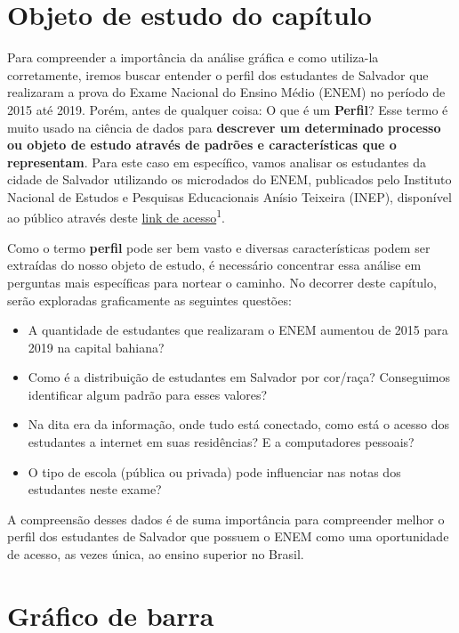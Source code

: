 \documentclass[
  portuguese,
  oneside]{book}
\begin{document}
\hypertarget{objeto-estudo}{%
\section{Objeto de estudo do capítulo}\label{objeto-estudo}}

Para compreender a importância da análise gráfica e como utiliza-la corretamente, iremos buscar entender o perfil dos estudantes de Salvador que realizaram a prova do Exame Nacional do Ensino Médio (ENEM) no período de 2015 até 2019. Porém, antes de qualquer coisa: O que é um \textbf{Perfil}? Esse termo é muito usado na ciência de dados para \textbf{descrever um determinado processo ou objeto de estudo através de padrões e características que o representam}. Para este caso em específico, vamos analisar os estudantes da cidade de Salvador utilizando os microdados do ENEM, publicados pelo Instituto Nacional de Estudos e Pesquisas Educacionais Anísio Teixeira (INEP), disponível ao público através deste \href{http://inep.gov.br/microdados}{link de acesso}\textsuperscript{1}.

Como o termo \textbf{perfil} pode ser bem vasto e diversas características podem ser extraídas do nosso objeto de estudo, é necessário concentrar essa análise em perguntas mais específicas para nortear o caminho. No decorrer deste capítulo, serão exploradas graficamente as seguintes questões:

\begin{itemize}
\item
  A quantidade de estudantes que realizaram o ENEM aumentou de 2015 para 2019 na capital bahiana?
\item
  Como é a distribuição de estudantes em Salvador por cor/raça? Conseguimos identificar algum padrão para esses valores?
\item
  Na dita era da informação, onde tudo está conectado, como está o acesso dos estudantes a internet em suas residências? E a computadores pessoais?
\item
  O tipo de escola (pública ou privada) pode influenciar nas notas dos estudantes neste exame?
\end{itemize}

A compreensão desses dados é de suma importância para compreender melhor o perfil dos estudantes de Salvador que possuem o ENEM como uma oportunidade de acesso, as vezes única, ao ensino superior no Brasil.

\hypertarget{gbarras}{%
\section{Gráfico de barra}\label{gbarras}}
\end{document}
